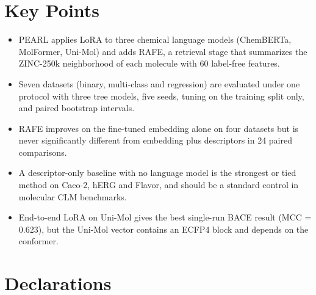 \documentclass[pdflatex,sn-basic]{sn-jnl}%
\begin{document}
\section*{Key Points}
\begin{itemize}

\item PEARL applies LoRA to three chemical language models (ChemBERTa, MolFormer, Uni-Mol) and adds RAFE, a retrieval stage that summarizes the ZINC-250k neighborhood of each molecule with 60 label-free features.
\item Seven datasets (binary, multi-class and regression) are evaluated under one protocol with three tree models, five seeds, tuning on the training split only, and paired bootstrap intervals.
\item RAFE improves on the fine-tuned embedding alone on four datasets but is never significantly different from embedding plus descriptors in 24 paired comparisons.
\item A descriptor-only baseline with no language model is the strongest or tied method on Caco-2, hERG and Flavor, and should be a standard control in molecular CLM benchmarks.
\item End-to-end LoRA on Uni-Mol gives the best single-run BACE result (MCC = 0.623), but the Uni-Mol vector contains an ECFP4 block and depends on the conformer.

\end{itemize}
\backmatter

\section*{Declarations}
\end{document}
